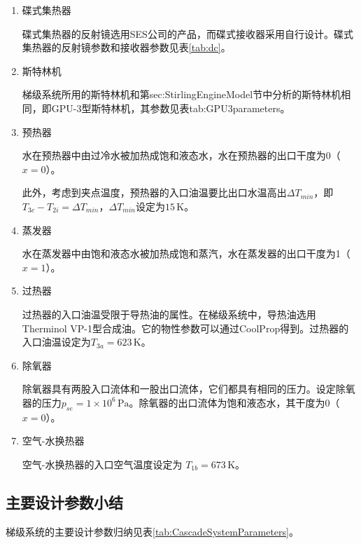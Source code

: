 \begin{enumerate}[label=(\arabic*)]
\item 碟式集热器

碟式集热器的反射镜选用SES公司的产品，而碟式接收器采用自行设计。碟式集热器的反射镜参数和接收器参数见表\ref{tab:dc}。

\item 斯特林机

梯级系统所用的斯特林机和第{sec:StirlingEngineModel}节中分析的斯特林机相同，即GPU-3型斯特林机，其参数见表{tab:GPU3parameters}。

\item 预热器

水在预热器中由过冷水被加热成饱和液态水，水在预热器的出口干度为0（$x = 0$）。

此外，考虑到夹点温度，预热器的入口油温要比出口水温高出$\Delta T_{min}$，即$T_{3c} - T_{2i} = \Delta T_{min}$，$\Delta T_{min}$设定为$15\,\mathrm{K}$。

\item 蒸发器

水在蒸发器中由饱和液态水被加热成饱和蒸汽，水在蒸发器的出口干度为1（$x = 1$）。

\item 过热器

过热器的入口油温受限于导热油的属性。在梯级系统中，导热油选用Therminol VP-1型合成油。它的物性参数可以通过CoolProp得到。过热器的入口油温设定为$T_{3a} = 623\,\mathrm{K}$。

\item 除氧器

除氧器具有两股入口流体和一股出口流体，它们都具有相同的压力。设定除氧器的压力$p_{se} = 1\times10^6\,\mathrm{Pa}$。除氧器的出口流体为饱和液态水，其干度为0（$x = 0$）。

\item 空气-水换热器

空气-水换热器的入口空气温度设定为 $T_{1b} = 673\,\mathrm{K}$。
\end{enumerate}

\subsection{主要设计参数小结}
梯级系统的主要设计参数归纳见表\ref{tab:CascadeSystemParameters}。

